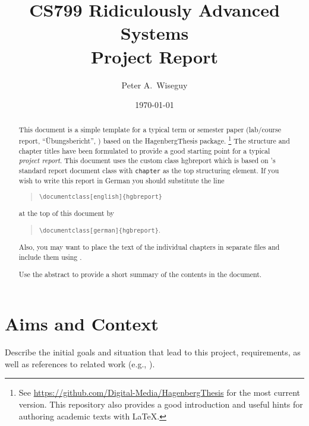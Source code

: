 \documentclass[notitlepage,english]{hgbreport}
\author{Peter A.\ Wiseguy}
\title{CS799 Ridiculously Advanced Systems\\ %
			Project Report}	%
\date{\today}
\begin{document}

\maketitle

\begin{abstract}\noindent
This document is a simple template for a typical term or semester paper (lab/course report, 
``Übungsbericht'', \etc) based on the \textsf{HagenbergThesis} \latex package.%
\footnote{See \url{https://github.com/Digital-Media/HagenbergThesis} for the most current version.
This repository also provides a good introduction and useful hints for authoring academic texts with LaTeX.}
The structure and chapter titles have been formulated to provide a good starting point
for a typical \emph{project report}.
This document uses the custom class \textsf{hgbreport} which is based on \latex's standard \textsf{report} 
document class with \texttt{chapter} as the top structuring element. 
If you wish to write this report in German you should substitute the line
\begin{quote}
 \verb!\documentclass[english]{hgbreport}! 
\end{quote}
at the top of this document by
\begin{quote}
 \verb!\documentclass[german]{hgbreport}!.
\end{quote}
Also, you may want to place the text of the individual chapters in separate files and 
include them using \verb!!.

\bigskip
\noindent
Use the abstract to provide a short summary of the contents in the document.
\end{abstract}


\tableofcontents



\chapter{Aims and Context}

Describe the initial goals and situation that lead to this project, requirements, as well as
references to related work (e.g., \cite{Higham1998}).
\end{document}
